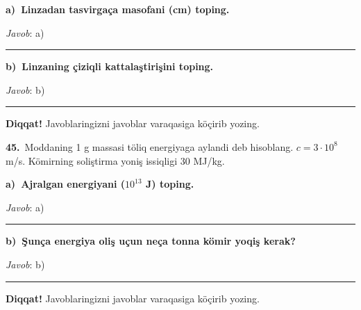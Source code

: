 \documentclass[11pt,a4paper]{article}
\newcommand{\blank}{\rule{5cm}{0.4pt}}
\begin{document}
\medskip\noindent\textbf{a)\ Linzadan tasvirgaça masofani (cm) toping.}\par
\noindent\textit{Javob}: a)\ \blank\par
\medskip\noindent\textbf{b)\ Linzaning çiziqli kattalaştirişini toping.}\par
\noindent\textit{Javob}: b)\ \blank\par
\medskip\noindent\textbf{Diqqat!} Javoblaringizni javoblar varaqasiga köçirib yozing.\par\vspace{10pt}
\noindent\textbf{45.}\ Moddaning 1 g massasi töliq energiyaga aylandi deb hisoblang. $c=3\cdot10^8$ m/s. Kömirning soliştirma yoniş issiqligi 30 MJ/kg.\par\smallskip
\medskip\noindent\textbf{a)\ Ajralgan energiyani ($10^{13}$ J) toping.}\par
\noindent\textit{Javob}: a)\ \blank\par
\medskip\noindent\textbf{b)\ Şunça energiya oliş uçun neça tonna kömir yoqiş kerak?}\par
\noindent\textit{Javob}: b)\ \blank\par
\medskip\noindent\textbf{Diqqat!} Javoblaringizni javoblar varaqasiga köçirib yozing.\par\vspace{10pt}
\end{document}
